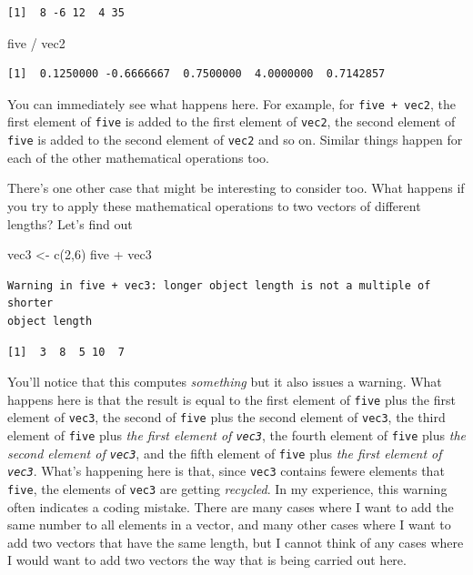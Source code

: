 \documentclass[
  letterpaper,
  DIV=11,
  numbers=noendperiod]{scrreprt}
\newenvironment{Shaded}{\begin{snugshade}}{\end{snugshade}}
\newcommand{\DecValTok}[1]{\textcolor[rgb]{0.68,0.00,0.00}{#1}}
\newcommand{\FunctionTok}[1]{\textcolor[rgb]{0.28,0.35,0.67}{#1}}
\newcommand{\NormalTok}[1]{\textcolor[rgb]{0.00,0.23,0.31}{#1}}
\newcommand{\OtherTok}[1]{\textcolor[rgb]{0.00,0.23,0.31}{#1}}
\newcommand{\SpecialCharTok}[1]{\textcolor[rgb]{0.37,0.37,0.37}{#1}}
\begin{document}
\begin{verbatim}
[1]  8 -6 12  4 35
\end{verbatim}

\begin{Shaded}
\begin{Highlighting}[]
\NormalTok{five }\SpecialCharTok{/}\NormalTok{ vec2}
\end{Highlighting}
\end{Shaded}

\begin{verbatim}
[1]  0.1250000 -0.6666667  0.7500000  4.0000000  0.7142857
\end{verbatim}

You can immediately see what happens here. For example, for
\texttt{five\ +\ vec2}, the first element of \texttt{five} is added to
the first element of \texttt{vec2}, the second element of \texttt{five}
is added to the second element of \texttt{vec2} and so on. Similar
things happen for each of the other mathematical operations too.

There's one other case that might be interesting to consider too. What
happens if you try to apply these mathematical operations to two vectors
of different lengths? Let's find out

\begin{Shaded}
\begin{Highlighting}[]
\NormalTok{vec3 }\OtherTok{\textless{}{-}} \FunctionTok{c}\NormalTok{(}\DecValTok{2}\NormalTok{,}\DecValTok{6}\NormalTok{)}
\NormalTok{five }\SpecialCharTok{+}\NormalTok{ vec3}
\end{Highlighting}
\end{Shaded}

\begin{verbatim}
Warning in five + vec3: longer object length is not a multiple of shorter
object length
\end{verbatim}

\begin{verbatim}
[1]  3  8  5 10  7
\end{verbatim}

You'll notice that this computes \emph{something} but it also issues a
warning. What happens here is that the result is equal to the first
element of \texttt{five} plus the first element of \texttt{vec3}, the
second of \texttt{five} plus the second element of \texttt{vec3}, the
third element of \texttt{five} plus \emph{the first element of
\texttt{vec3}}, the fourth element of \texttt{five} plus \emph{the
second element of \texttt{vec3}}, and the fifth element of \texttt{five}
plus \emph{the first element of \texttt{vec3}}. What's happening here is
that, since \texttt{vec3} contains fewere elements that \texttt{five},
the elements of \texttt{vec3} are getting \emph{recycled}. In my
experience, this warning often indicates a coding mistake. There are
many cases where I want to add the same number to all elements in a
vector, and many other cases where I want to add two vectors that have
the same length, but I cannot think of any cases where I would want to
add two vectors the way that is being carried out here.
\end{document}
